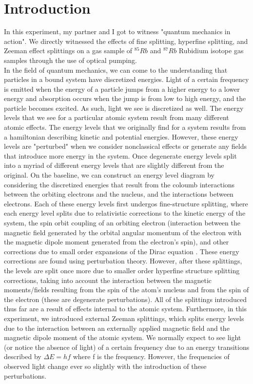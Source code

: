 \documentclass{article}
\begin{document}
\section{Introduction}
    In this experiment, my partner and I got to witness "quantum mechanics in action". We directly witnessed the effects of fine splitting, hyperfine splitting, and Zeeman effect splittings on a gas sample of $^{85}Rb$ and $^{87}Rb$ Rubidium isotope gas samples through the use of optical pumping.
    \\\indent In the field of quantum mechanics, we can come to the understanding that particles in a bound system have discretized energies. Light of a certain frequency is emitted when the energy of a particle jumps from a higher energy to a lower energy and absorption occurs when the jump is from low to high energy, and the particle becomes excited. As such, light we see is discretized as well. The energy levels that we see for a particular atomic system result from many different atomic effects. The energy levels that we originally find for a system results from a hamiltonian describing kinetic and potential energies. However, these energy levels are "perturbed" when we consider nonclassical effects or generate any fields that introduce more energy in the system. Once degenerate energy levels split into a myriad of different energy levels that are slightly different from the original. On the baseline, we can construct an energy level diagram by considering the discretized energies that result from the coloumb interactions between the orbiting electrons and the nucleus, and the interactions between electrons. Each of these energy levels first undergos fine-structure splitting, where each energy level splits due to relativistic corrections to the kinetic energy of the system, the spin orbit coupling of an orbiting electron (interaction between the magnetic field generated by the orbital angular momentum of the electron with the magnetic dipole moment generated from the electron's spin), and other corrections due to small order expansions of the Dirac equation \cite{fs}.
    These energy corrections are found using perturbation theory. However, after these splittings, the levels are split once more due to smaller order hyperfine structure splitting corrections, taking into account the interaction between the magnetic moments/fields resulting from the spin of the atom's nucleus and from the spin of the electron (these are degenerate perturbations). All of the splittings introduced thus far are a result of effects internal to the atomic system. Furthermore, in this experiment, we introduced external Zeeman splittings, which splits energy levels due to the interaction between an externally applied magnetic field and the magnetic dipole moment of the atomic system. We normally expect to see light (or notice the absence of light) of a certain frequency due to an energy transitions described by $\Delta E = hf$ where f is the frequency. However, the frequencies of observed light change ever so slightly with the introduction of these perturbations. 
\end{document}
